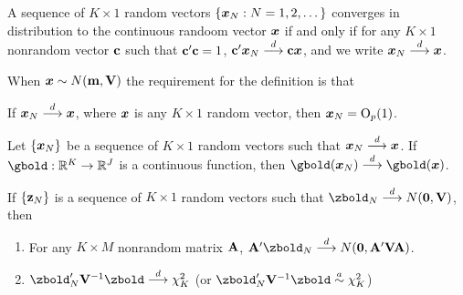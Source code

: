 \documentclass[11pt, oneside, a4paper, article]{article}
\numberwithin{equation}{section}
\begin{document}
\begin{defn} 
	A sequence of $K \times 1$ random vectors $\{\boldsymbol{x}_{N}: N=1,2, \dots\}$ converges in distribution to the continuous randoom vector $\boldsymbol{x}$
	if and only if
	for any $K \times 1$ nonrandom vector $\mathbf{c}$ such that
	$\mathbf{c}' \mathbf{c} = 1$, $\mathbf{c}' \boldsymbol{x}_{N}  \overset{d}{\longrightarrow}  \mathbf{c} \boldsymbol{x}$, 
	and we write $\boldsymbol{x}_{N}  \overset{d}{\longrightarrow}  \boldsymbol{x}$.
\end{defn}

\begin{remark}
	When $\boldsymbol{x} \sim N(\mathbf{m}, \mathbf{V})$ 
	the requirement for the definition is that
\end{remark}

\begin{lem}
	If $\boldsymbol{x}_{N}  \overset{d}{\longrightarrow}  \boldsymbol{x}$,
	where $\boldsymbol{x}$ is any $K \times 1$ random vector, 
	then $\boldsymbol{x}_{N} = \text{O}_{p}(1)$.
\end{lem}

\begin{lem}
	Let $\{\boldsymbol{x}_{N}\}$ be a sequence of $K \times 1$ random vectors such that
	$\boldsymbol{x}_{N}  \overset{d}{\longrightarrow}  \boldsymbol{x}$.
	If $\gbold: \R^{K} \to \R^{J}$ is a continuous function, then
	$\gbold(\xvec_{N}) \arrowd \gbold(\xvec)$.
\end{lem}

\begin{cor}
If $\{\mathbf{z}_{N}\}$ is a sequence of $K \times 1$ random vectors such that
$\zbold_{N} \arrowd N(\mbs{0}, \Vbold)$, then
\vspace{-1 ex}
\begin{enumerate}[noitemsep]
\item For any $K \times M$ nonrandom matrix $\mathbf{A}$,
		$\Abold' \zbold_{N} \arrowd N(\mbs{0}, \Abold' \Vbold \Abold)$.

\item $\zbold_{N}' \Vbold^{-1}\zbold \arrowd \chi_{K}^{2}$ 
		(or $\zbold_{N}' \Vbold^{-1} \zbold \asim \chi_{K}^{2}$)
\end{enumerate}
\end{cor}
\end{document}

